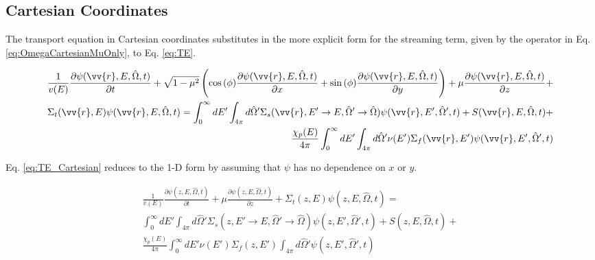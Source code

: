\documentclass[10pt]{article}
\begin{document}
\begin{flushleft}
\subsection{Cartesian Coordinates}

The transport equation in Cartesian coordinates substitutes in the more explicit form for the streaming term, given by the operator in Eq. \ref{eq:OmegaCartesianMuOnly}, to Eq. \ref{eq:TE}. 

\begin{equation}
\label{eq:TE_Cartesian}
\begin{aligned}
\frac{1}{v(E)} \frac{\partial\psi(\vv{r}, E, \hat{\Omega},t)}{\partial t} +
 \sqrt{1-\mu^2}\left(\cos{(\phi)}\frac{\partial \psi(\vv{r}, E, \hat{\Omega},t)}{\partial x} + \sin{(\phi)} \frac{\partial \psi(\vv{r}, E, \hat{\Omega},t)}{\partial y}\right) + \mu \frac{\partial \psi(\vv{r}, E, \hat{\Omega},t)}{\partial z} +\\
 \Sigma_t(\vv{r},E)\psi(\vv{r}, E, \hat{\Omega},t) = \int_{0}^{\infty}dE' \int_{4\pi}^{ } d\hat{\Omega}' \Sigma_s(\vv{r}, E'\rightarrow E, \hat{\Omega}'\rightarrow\hat{\Omega})\psi(\vv{r}, E', \hat{\Omega}',t) + S(\vv{r}, E, \hat{\Omega}, t)+\\
 \frac{\chi_p(E)}{4\pi} \int_{0}^{\infty} dE'\int_{4\pi}^{} d\hat{\Omega}'\nu(E')\Sigma_f(\vv{r}, E')\psi(\vv{r}, E', \hat{\Omega}',t)\\
\end{aligned}
\end{equation}

Eq. \ref{eq:TE_Cartesian} reduces to the 1-D form by assuming that \(\psi\) has no dependence on \(x\) or \(y\). 

\begin{equation}
\label{eq:TE_Cartesian_1D}
\begin{aligned}
\frac{1}{v(E)} \frac{\partial\psi(z, E, \hat{\Omega},t)}{\partial t} +
 \mu \frac{\partial \psi(z, E, \hat{\Omega},t)}{\partial z} + \Sigma_t(z,E)\psi(z, E, \hat{\Omega},t) = \\
 \int_{0}^{\infty}dE' \int_{4\pi}^{ } d\hat{\Omega}' \Sigma_s(z, E'\rightarrow E, \hat{\Omega}'\rightarrow\hat{\Omega})\psi(z, E', \hat{\Omega}',t) + S(z, E, \hat{\Omega},t)+\\
 \frac{\chi_p(E)}{4\pi} \int_{0}^{\infty} dE'\nu(E')\Sigma_f(z, E')\int_{4\pi}^{} d\hat{\Omega}'\psi(z, E', \hat{\Omega}',t)\\
\end{aligned}
\end{equation}


\end{flushleft}
\end{document}
